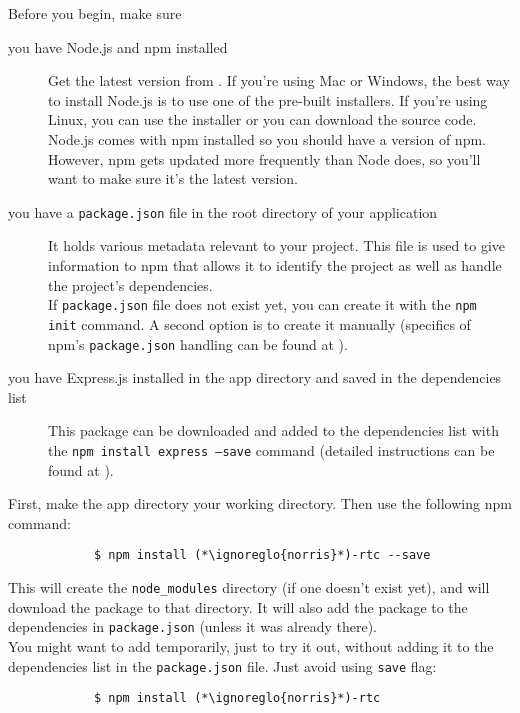 		Before you begin, make sure
		\begin{description}
			\item[you have Node.js and npm installed] Get the latest version from . If you're using Mac or Windows, the best way to install Node.js is to use one of the pre-built installers. If you're using Linux, you can use the installer or you can download the source code.\\
			Node.js comes with npm installed so you should have a version of npm. However, npm gets updated more frequently than Node does, so you'll want to make sure it's the latest version.
			\item[you have a \texttt{package.json} file in the root directory of your application] It holds various metadata relevant to your project. This file is used to give information to npm that allows it to identify the project as well as handle the project's dependencies.\\
			If \texttt{package.json} file does not exist yet, you can create it with the \texttt{npm init} command. A second option is to create it manually (specifics of npm's \texttt{package.json} handling can be found at ).
			\item[you have Express.js installed in the app directory and saved in the dependencies list] This package can be downloaded and added to the dependencies list with the \texttt{npm install express --save} command (detailed instructions can be found at ).
		\end{description}
		First, make the app directory your working directory. Then use the following npm command:
		\begin{lstlisting}
			$ npm install (*\ignoreglo{norris}*)-rtc --save
		\end{lstlisting}
		This will create the \texttt{node\_modules} directory (if one doesn't exist yet), and will download the package to that directory. It will also add the package to the dependencies in \texttt{package.json} (unless it was already there).\\
		You might want to add  temporarily, just to try it out, without adding it to the dependencies list in the \texttt{package.json} file. Just avoid using \texttt{save} flag:
		\begin{lstlisting}
			$ npm install (*\ignoreglo{norris}*)-rtc
		\end{lstlisting}